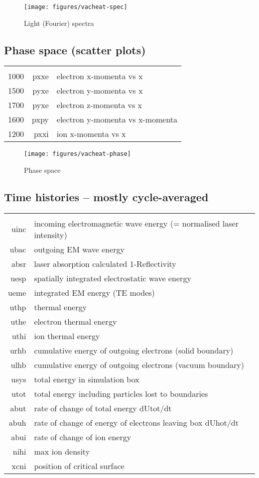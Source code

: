 \documentclass[11pt]{article}
\begin{document}
\begin{figure}[ht]
\begin{center}
\texttt{[image: figures/vacheat-spec]}
\caption{Light (Fourier) spectra}
\end{center}
\end{figure}


\subsection{Phase space (scatter plots)} 
\begin{tabular}{rrl}
\hline\\ 
1000 &pxxe& electron x-momenta vs x\\ 
1500 & pyxe& electron y-momenta vs x \\
1700 & pyxe& electron z-momenta vs x \\
1600 & pxpy& electron y-momenta vs x-momenta \\
1200 & pxxi& ion x-momenta vs x
\end{tabular}

\begin{figure}[ht]
\begin{center}
\texttt{[image: figures/vacheat-phase]}
\caption{Phase space}
\end{center}
\end{figure}


\subsection{Time histories -- mostly cycle-averaged} 
\begin{tabular}{rl}
\hline\\ 
uinc& incoming electromagnetic wave energy (= normalised laser intensity) \\
ubac& outgoing EM wave energy \\
absr& laser absorption calculated 1-Reflectivity\\ 
uesp& spatially integrated electrostatic wave energy\\ 
ueme& integrated EM energy (TE modes) \\
uthp& thermal energy \\
uthe& electron thermal energy \\
uthi& ion thermal energy \\
urhb& cumulative energy of outgoing electrons (solid boundary)\\ 
ulhb& cumulative energy of outgoing electrons (vacuum boundary) \\
usys& total energy in simulation box \\
utot& total energy including particles lost to boundaries \\
abut& rate of change of total energy dUtot/dt \\
abuh& rate of change of energy of electrons leaving box dUhot/dt \\
abui& rate of change of ion energy \\
nihi& max ion density \\
xcni& position of critical surface 
\end{tabular}
\end{document}
